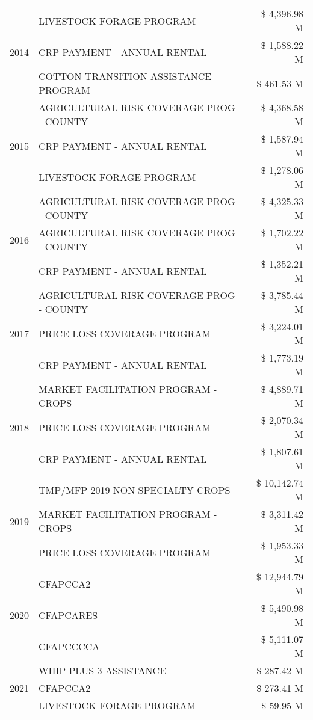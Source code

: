 \begin{tabular}{llr}
\cline{1-3}
\multirow[t]{3}{*}{2014} & LIVESTOCK FORAGE PROGRAM & \$ 4,396.98 M \\
 & CRP PAYMENT - ANNUAL RENTAL & \$ 1,588.22 M \\
 & COTTON TRANSITION ASSISTANCE PROGRAM & \$ 461.53 M \\
\cline{1-3}
\multirow[t]{3}{*}{2015} & AGRICULTURAL RISK COVERAGE PROG - COUNTY & \$ 4,368.58 M \\
 & CRP PAYMENT - ANNUAL RENTAL & \$ 1,587.94 M \\
 & LIVESTOCK FORAGE PROGRAM & \$ 1,278.06 M \\
\cline{1-3}
\multirow[t]{3}{*}{2016} & AGRICULTURAL RISK COVERAGE PROG - COUNTY & \$ 4,325.33 M \\
 & AGRICULTURAL RISK COVERAGE PROG - COUNTY      & \$ 1,702.22 M \\
 & CRP PAYMENT - ANNUAL RENTAL & \$ 1,352.21 M \\
\cline{1-3}
\multirow[t]{3}{*}{2017} & AGRICULTURAL RISK COVERAGE PROG - COUNTY & \$ 3,785.44 M \\
 & PRICE LOSS COVERAGE PROGRAM & \$ 3,224.01 M \\
 & CRP PAYMENT - ANNUAL RENTAL & \$ 1,773.19 M \\
\cline{1-3}
\multirow[t]{3}{*}{2018} & MARKET FACILITATION PROGRAM - CROPS & \$ 4,889.71 M \\
 & PRICE LOSS COVERAGE PROGRAM & \$ 2,070.34 M \\
 & CRP PAYMENT - ANNUAL RENTAL & \$ 1,807.61 M \\
\cline{1-3}
\multirow[t]{3}{*}{2019} & TMP/MFP 2019 NON SPECIALTY CROPS & \$ 10,142.74 M \\
 & MARKET FACILITATION PROGRAM - CROPS & \$ 3,311.42 M \\
 & PRICE LOSS COVERAGE PROGRAM & \$ 1,953.33 M \\
\cline{1-3}
\multirow[t]{3}{*}{2020} & CFAPCCA2 & \$ 12,944.79 M \\
 & CFAPCARES & \$ 5,490.98 M \\
 & CFAPCCCCA & \$ 5,111.07 M \\
\cline{1-3}
\multirow[t]{3}{*}{2021} & WHIP PLUS 3 ASSISTANCE & \$ 287.42 M \\
 & CFAPCCA2 & \$ 273.41 M \\
 & LIVESTOCK FORAGE PROGRAM & \$ 59.95 M \\
\cline{1-3}
\bottomrule
\end{tabular}

